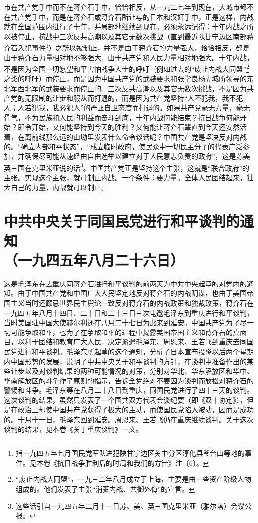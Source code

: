 \documentclass[cn,11pt,chinese]{elegantbook}
\def\myformat#1{\hfil\hfil #1}
\begin{document}
市在共产党手中而不在蒋介石手中，恰恰相反，从一九二七年到现在，大城市都不在共产党手中，而是在蒋介石或蒋介石所让与的日本和汉奸手中，正是这样，内战就在全国范围内进行了十年，并局部地继续到现在。必须永远记得：十年内战之所以被停止，抗战中三次反共高潮以及其它无数次挑战（直到最近陕甘宁边区南部蒋介石入犯事件\footnote[3]{ 指一九四五年七月国民党军队进犯陕甘宁边区关中分区淳化县爷台山等地的事件。见本卷《抗日战争胜利后的时局和我们的方针》注〔6〕。}）之所以被制止，并不是由于蒋介石的力量强大，恰恰相反，都是由于蒋介石力量相对地不够强大，由于共产党和人民力量相对地强大。十年内战，不是因为全国一切愿望和平害怕战争人士的呼吁（例如过去的“废止内战大同盟”\footnote[4]{ “废止内战大同盟”，一九三二年八月成立于上海，主要是由一些资产阶级人物组成的。他们发表了主张“消弭内战、共御外侮”的宣言。}之类的呼吁）而停止，而是因为中国共产党的武装要求和张学良杨虎城所领导的东北军西北军的武装要求而停止的。三次反共高潮以及其它无数次挑战，不是因为共产党的无限制的让步和服从而打退的，而是因为共产党坚持“人不犯我，我不犯人；人若犯我，我必犯人”的严正自卫态度而打退的。如果共产党毫无力量，毫无骨气，不为民族和人民的利益而奋斗到底，十年内战何能结束？抗日战争何能开始？即令开始，又何能坚持到今天的胜利？又何能让蒋介石辈直到今天还安然活着，在离前线那么远的山坳里发表什么命令谈话呢？中国共产党是坚决反对内战的。“确立内部和平状态”，“成立临时政府，使民众中一切民主分子的代表广泛参加，并确保尽可能从速经由自由选举以建立对于人民意志负责的政府”，这是苏美英三国在克里米亚说的话\footnote[5]{ 这些话引自一九四五年二月十一日苏、美、英三国克里米亚（雅尔塔）会议公报。}。中国共产党正是坚持这个主张，这就是“联合政府”的主张。实现这个主张，就可制止内战。一个条件：要力量。全体人民团结起来，壮大自己的力量，内战就可以制止。\\
\newpage\section*{\myformat{中共中央关于同国民党进行和平谈判的通知}\\\myformat{（一九四五年八月二十六日）}}
\begin{introduction}\item  这是毛泽东在去重庆同蒋介石进行和平谈判的前两天为中共中央起草的对党内的通知。由于中国共产党和中国广大人民坚定地反对蒋介石的内战阴谋，也由于美国帝国主义当时还顾忌世界民主舆论一致反对蒋介石的内战政策和独裁政策，蒋介石在一九四五年八月十四日、二十日和二十三日三次电邀毛泽东到重庆进行和平谈判，当时美国驻中国大使赫尔利还在八月二十七日为此来到延安。中国共产党为了尽一切可能争取和平，也为了在争取和平的过程中揭露美国帝国主义和蒋介石的真面目，以利于团结和教育广大人民，决定派遣毛泽东、周恩来、王若飞到重庆去同国民党进行和平谈判。毛泽东所起草的这个通知，分析了日本宣布投降以后两个星期内中国形势的发展，说明了中共中央关于和平谈判的方针，在谈判中准备作出的某些让步以及对谈判结果的两种可能情况的对策，分别对华北、华东解放区和华中、华南解放区的斗争作了原则的指示，告诉全党绝对不要因为谈判而放松对蒋介石的警惕和斗争。毛泽东等在八月二十八日到重庆，同国民党进行了四十三天的谈判。这次谈判的结果，虽然只发表了一个国共双方代表会谈纪要（即《双十协定》），但是在政治上却使中国共产党获得了极大的主动，而使国民党陷入被动，因而是成功的。十月十一日，毛泽东回到延安。周恩来、王若飞仍在重庆继续谈判。关于这次谈判的结果，见本卷《关于重庆谈判》一文。\end{introduction}
\end{document}
